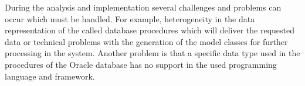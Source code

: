 During the analysis and implementation several challenges and problems can occur which must be handled. For example, heterogeneity in the data representation of the called database procedures which will deliver the requested data or technical problems with the generation of the model classes for further processing in the system. Another problem is that a specific data type used in the procedures of the Oracle database has no support in the used programming language and framework.  
 
